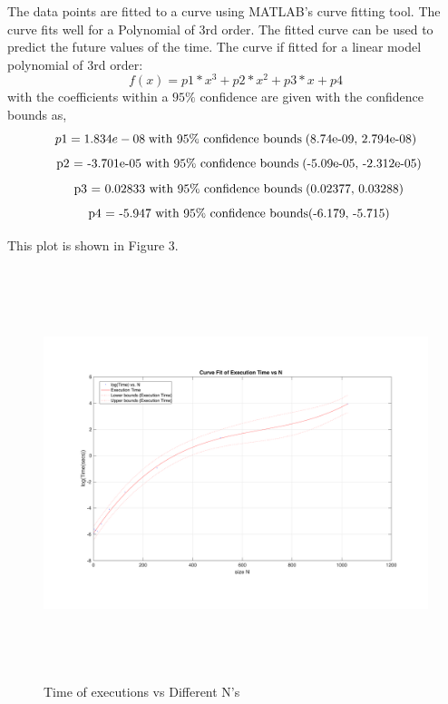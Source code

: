 \documentclass[fleqn,letterpaper,12pt]{report}
\begin{document}
The data points are fitted to a curve using MATLAB's curve fitting tool. The curve fits well for a Polynomial of 3rd order. The fitted curve can be used to predict the future values of the time.
The curve if fitted for a linear model polynomial of 3rd order:\cite{curvefitting}
\begin{equation}
\label{EQ3}
     f(x) = p1*x^3 + p2*x^2 + p3*x + p4
\end{equation}
with the coefficients within a $95\%$ confidence are given with the confidence bounds as,
\begin{equation}
     p1 =   1.834e-08 
	 \mbox{\;with 95\% confidence bounds\;(8.74e-09, 2.794e-08)}
\label{EQ4}
\end{equation}
\begin{equation}
     \mbox{\;\;p2 =  -3.701e-05 with 95\% confidence bounds\;(-5.09e-05, -2.312e-05)} 
\label{EQ5}
\end{equation}
\begin{equation}
     \mbox{\;\;p3 =   0.02833 with 95\% confidence bounds\;(0.02377, 0.03288)}
\label{EQ6}
\end{equation}
\begin{equation}
     \mbox{\;\;p4 =   -5.947 with 95\% confidence bounds(-6.179, -5.715)}
\label{EQ7}
\end{equation}

This plot is shown in Figure 3.
\begin{figure}[ht!]
	\centering
	\includegraphics[height=120mm,width=160mm]{matrixcurve.pdf}
	\caption{Time of executions vs Different N's\label{overflow}}
\end{figure}
\end{document}

